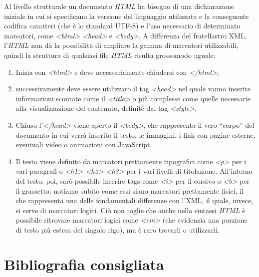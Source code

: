 \documentclass[
  b5paper,
  twoside,
  11pt,
  chapterprefix=false,
  bibliography=totocnumbered,
  listof=flat]{scrbook}
\begin{document}
Al livello strutturale un documento \emph{HTML} ha bisogno di una
dichiarazione iniziale in cui si specificano la versione del linguaggio
utilizzata e la conseguente codifica caratteri (che è lo standard UTF-8)
e l'uso necessario di determinato marcatori, come \emph{\textless html\textgreater{} \textless head\textgreater{}} e
\emph{\textless body\textgreater{}}. A differenza del fratellastro XML, l'\emph{HTML} non dà la
possibilità di ampliare la gamma di marcatori utilizzabili, quindi la
struttura di qualsiasi file \emph{HTML} risulta grossomodo uguale:

\begin{enumerate}
\def\labelenumi{\arabic{enumi}.}
\item
  Inizia con \emph{\textless html\textgreater{}} e deve necessariamente chiudersi con
  \emph{\textless/html\textgreater{}};
\item
  successivamente deve essere utilizzato il tag \emph{\textless head\textgreater{}} nel quale
  vanno inserite informazioni scontate come il \emph{\textless title\textgreater{}} o più
  complesse come quelle necessarie alla visualizzazione del contenuto,
  definite dal tag \emph{\textless style\textgreater{}}.
\item
  Chiuso l'\emph{\textless/head\textgreater{}} viene aperto il \emph{\textless body\textgreater{}}, che rappresenta il
  vero \enquote{corpo} del documento in cui verrà inserito il testo, le
  immagini, i link con pagine esterne, eventuali video o animazioni
  con JavaScript.
\item
  Il testo viene definito da marcatori prettamente tipografici come
  \emph{\textless p\textgreater{}} per i vari paragrafi o \emph{\textless h1\textgreater{} \textless h2\textgreater{} \textless h3\textgreater{}} per i vari
  livelli di titolazione. All'interno del testo, poi, sarò possibile
  inserire tags come \emph{\textless i\textgreater{}} per il corsivo o \emph{\textless b\textgreater{}} per il
  grassetto; notiamo subito come essi siano marcatori prettamente
  fisici, il che rappresenta una delle fondamentali differenze con
  l'XML, il quale, invece, si serve di marcatori logici. Ciò non
  toglie che anche nella sintassi \emph{HTML} è possibile ritrovare
  marcatori logici come \emph{\textless em\textgreater{}} (che evidenzia una porzione di testo
  più estesa del singolo rigo), ma è raro trovarli o utilizzarli.
\end{enumerate}

\hypertarget{bibliografia-consigliata-12}{%
\section*{Bibliografia consigliata}\label{bibliografia-consigliata-12}}
\end{document}
